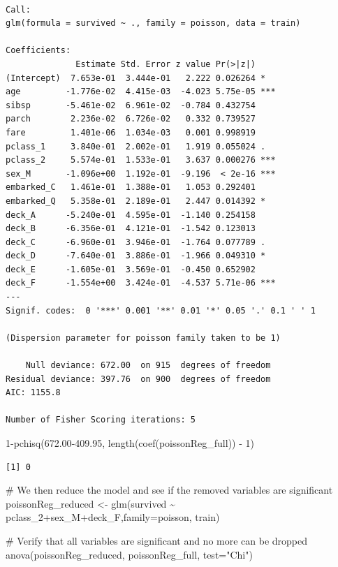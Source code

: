 \documentclass[
  letterpaper,
  DIV=11,
  numbers=noendperiod]{scrartcl}
\newenvironment{Shaded}{\begin{snugshade}}{\end{snugshade}}
\newcommand{\AttributeTok}[1]{\textcolor[rgb]{0.40,0.45,0.13}{#1}}
\newcommand{\CommentTok}[1]{\textcolor[rgb]{0.37,0.37,0.37}{#1}}
\newcommand{\DecValTok}[1]{\textcolor[rgb]{0.68,0.00,0.00}{#1}}
\newcommand{\FloatTok}[1]{\textcolor[rgb]{0.68,0.00,0.00}{#1}}
\newcommand{\FunctionTok}[1]{\textcolor[rgb]{0.28,0.35,0.67}{#1}}
\newcommand{\NormalTok}[1]{\textcolor[rgb]{0.00,0.23,0.31}{#1}}
\newcommand{\OtherTok}[1]{\textcolor[rgb]{0.00,0.23,0.31}{#1}}
\newcommand{\SpecialCharTok}[1]{\textcolor[rgb]{0.37,0.37,0.37}{#1}}
\newcommand{\StringTok}[1]{\textcolor[rgb]{0.13,0.47,0.30}{#1}}
\begin{document}
\begin{verbatim}

Call:
glm(formula = survived ~ ., family = poisson, data = train)

Coefficients:
              Estimate Std. Error z value Pr(>|z|)    
(Intercept)  7.653e-01  3.444e-01   2.222 0.026264 *  
age         -1.776e-02  4.415e-03  -4.023 5.75e-05 ***
sibsp       -5.461e-02  6.961e-02  -0.784 0.432754    
parch        2.236e-02  6.726e-02   0.332 0.739527    
fare         1.401e-06  1.034e-03   0.001 0.998919    
pclass_1     3.840e-01  2.002e-01   1.919 0.055024 .  
pclass_2     5.574e-01  1.533e-01   3.637 0.000276 ***
sex_M       -1.096e+00  1.192e-01  -9.196  < 2e-16 ***
embarked_C   1.461e-01  1.388e-01   1.053 0.292401    
embarked_Q   5.358e-01  2.189e-01   2.447 0.014392 *  
deck_A      -5.240e-01  4.595e-01  -1.140 0.254158    
deck_B      -6.356e-01  4.121e-01  -1.542 0.123013    
deck_C      -6.960e-01  3.946e-01  -1.764 0.077789 .  
deck_D      -7.640e-01  3.886e-01  -1.966 0.049310 *  
deck_E      -1.605e-01  3.569e-01  -0.450 0.652902    
deck_F      -1.554e+00  3.424e-01  -4.537 5.71e-06 ***
---
Signif. codes:  0 '***' 0.001 '**' 0.01 '*' 0.05 '.' 0.1 ' ' 1

(Dispersion parameter for poisson family taken to be 1)

    Null deviance: 672.00  on 915  degrees of freedom
Residual deviance: 397.76  on 900  degrees of freedom
AIC: 1155.8

Number of Fisher Scoring iterations: 5
\end{verbatim}

\begin{Shaded}
\begin{Highlighting}[]
\DecValTok{1}\SpecialCharTok{{-}}\FunctionTok{pchisq}\NormalTok{(}\FloatTok{672.00{-}409.95}\NormalTok{, }\FunctionTok{length}\NormalTok{(}\FunctionTok{coef}\NormalTok{(poissonReg\_full)) }\SpecialCharTok{{-}} \DecValTok{1}\NormalTok{)}
\end{Highlighting}
\end{Shaded}

\begin{verbatim}
[1] 0
\end{verbatim}

\begin{Shaded}
\begin{Highlighting}[]
\CommentTok{\# We then reduce the model and see if the removed variables are significant}
\NormalTok{poissonReg\_reduced }\OtherTok{\textless{}{-}} \FunctionTok{glm}\NormalTok{(survived }\SpecialCharTok{\textasciitilde{}}\NormalTok{ pclass\_2}\SpecialCharTok{+}\NormalTok{sex\_M}\SpecialCharTok{+}\NormalTok{deck\_F,}\AttributeTok{family=}\NormalTok{poisson, train)}

\CommentTok{\# Verify that all variables are significant and no more can be dropped}
\FunctionTok{anova}\NormalTok{(poissonReg\_reduced, poissonReg\_full, }\AttributeTok{test=}\StringTok{"Chi"}\NormalTok{)}
\end{Highlighting}
\end{Shaded}
\end{document}
